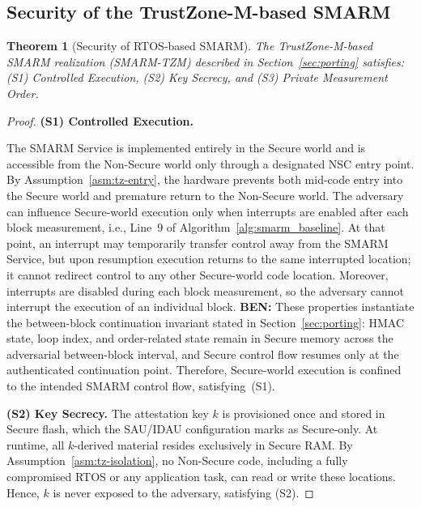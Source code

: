 \documentclass{ieeeaccess}
\DeclareRobustCommand{\ben}[1]{{\color{BENcolor}\textbf{BEN:} #1}}
\newcommand{\smarm}{SMARM\xspace}
\newtheorem{theorem}{Theorem}[section]
\begin{document}
\subsection{Security of the TrustZone-M-based \smarm}
\label{sec:tzm-security}

\begin{theorem}[Security of RTOS-based SMARM]
\label{thm:tzm}
The TrustZone-M-based SMARM realization (SMARM-TZM) described in Section~\ref{sec:porting} satisfies: (S1) Controlled Execution,
(S2) Key Secrecy, and (S3) Private Measurement Order.
\end{theorem}

 
\begin{proof}


\textbf{(S1) Controlled Execution.}

The SMARM Service is implemented entirely in the Secure world and is accessible from the Non-Secure world only through a designated NSC entry point.
By Assumption~\ref{asm:tz-entry}, the hardware prevents both mid-code entry into the Secure world and premature return to the Non-Secure world.
The adversary can influence Secure-world execution only when interrupts are enabled after each block measurement, i.e., Line~9 of Algorithm~\ref{alg:smarm_baseline}.
At that point, an interrupt may temporarily transfer control away from the SMARM Service, but upon resumption execution returns to the same interrupted location; it cannot redirect control to any other Secure-world code location.
Moreover, interrupts are disabled during each block measurement, so the adversary cannot interrupt the execution of an individual block.
\ben{These properties instantiate the between-block continuation invariant stated in Section~\ref{sec:porting}: HMAC state, loop index, and order-related state remain in Secure memory across the adversarial between-block interval, and Secure control flow resumes only at the authenticated continuation point.}
Therefore, Secure-world execution is confined to the intended SMARM control flow, satisfying~(S1).
 
\medskip
\noindent\textbf{(S2) Key Secrecy.}
The attestation key $k$ is provisioned once and stored in Secure flash,
which the SAU/IDAU configuration marks as Secure-only.
At runtime, all $k$-derived material resides exclusively in Secure RAM.
By Assumption~\ref{asm:tz-isolation}, no Non-Secure code, including a
fully compromised RTOS or any application task, can read or write these locations.
Hence, $k$ is never exposed to the adversary, satisfying (S2).
 

\end{proof}
\end{document}
